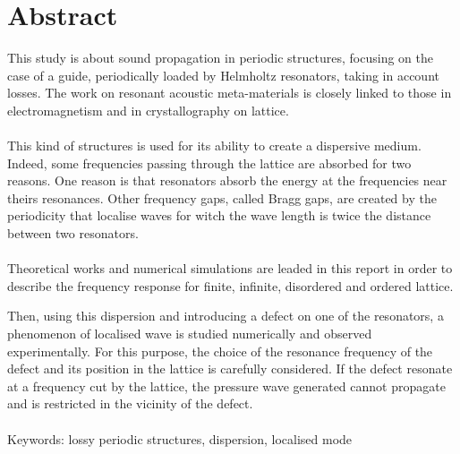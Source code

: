 \chapter*{Abstract}

This study is about sound propagation in periodic structures, focusing on the case of a guide, periodically loaded by Helmholtz resonators, taking in account losses. The work on resonant acoustic meta-materials is closely linked to those in electromagnetism and in crystallography on lattice.\\~\\ %

This kind of structures is used for its ability to create a dispersive medium. Indeed, some frequencies passing through the lattice are absorbed for two reasons. One reason is that resonators absorb the energy at the frequencies near theirs resonances. Other frequency gaps, called Bragg gaps, are created by the periodicity that localise waves for witch the wave length is twice the distance between two resonators.\\~\\

Theoretical works and numerical simulations are leaded in this report in order to describe the frequency response for finite, infinite, disordered and ordered lattice. 

Then, using this dispersion and introducing a defect on one of the resonators, a phenomenon of localised wave is studied numerically and observed experimentally. For this purpose, the choice of the resonance frequency of the defect and its position in the lattice is carefully considered. If the defect resonate at a frequency cut by the lattice, the pressure wave generated cannot propagate and is restricted in the vicinity of the defect.\\~\\ 


Keywords: lossy periodic structures, dispersion, localised mode 




